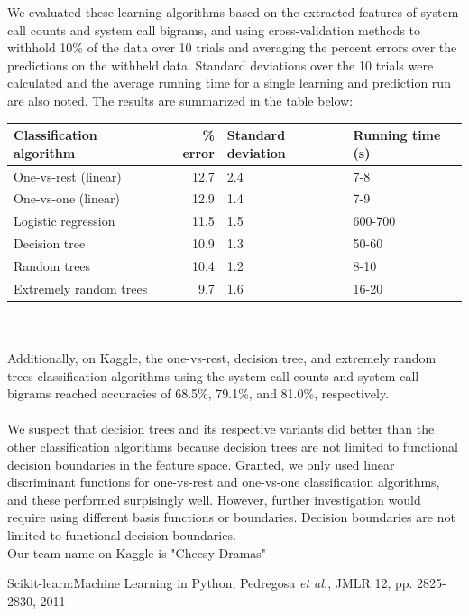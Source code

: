 \documentclass[11pt]{amsart}
\begin{document}
We evaluated these learning algorithms based on the extracted features of system call counts and system call bigrams, and using cross-validation methods to withhold 10\% of the data over 10 trials and averaging the percent errors over the predictions on the withheld data. Standard deviations over the 10 trials were calculated and the average running time for a single learning and prediction run are also noted. The results are summarized in the table below:\\

\begin{tabular}{l | r | l | l}
Classification algorithm & \% error & Standard deviation & Running time (s)\\
\hline
One-vs-rest (linear) & 12.7 & 2.4 & 7-8 \\
One-vs-one (linear) & 12.9 & 1.4 & 7-9\\
Logistic regression & 11.5 & 1.5 & 600-700\\
Decision tree & 10.9 & 1.3 & 50-60 \\
Random trees & 10.4 & 1.2 & 8-10\\
Extremely random trees & 9.7 & 1.6 &16-20\\
\end{tabular}
\\
\\
Additionally, on Kaggle, the one-vs-rest, decision tree, and extremely random trees classification algorithms using the system call counts and system call bigrams reached accuracies of 68.5\%, 79.1\%, and 81.0\%, respectively.\\
\\
We suspect that decision trees and its respective variants did better than the other classification algorithms because decision trees are not limited to functional decision boundaries in the feature space. Granted, we only used linear discriminant functions for one-vs-rest and one-vs-one classification algorithms, and these performed surpisingly well. However, further investigation would require using different basis functions or boundaries. Decision boundaries are not limited to functional decision boundaries.\\

 Our team name on Kaggle is "Cheesy Dramas"


\begingroup
\begin{thebibliography}{9}


Scikit-learn:Machine Learning in Python, Pedregosa \emph{et al.}, JMLR 12, pp. 2825-2830, 2011

\end{thebibliography}
\endgroup
\end{document}
